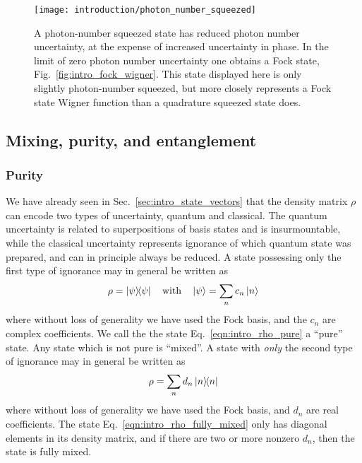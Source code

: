 \begin{figure}[htp]
\centering
\captionsetup{width=0.8\linewidth}
\texttt{[image: introduction/photon\_number\_squeezed]}
\caption{\label{fig:intro_photon_number_squeezed_wigner} A photon-number squeezed state has reduced photon number uncertainty, at the expense of increased uncertainty in phase. In the limit of zero photon number uncertainty one obtains a Fock state, Fig.~\ref{fig:intro_fock_wigner}. This state displayed here is only slightly photon-number squeezed, but more closely represents a Fock state Wigner function than a quadrature squeezed state does. }
\end{figure}



\FloatBarrier
\subsection{Mixing, purity, and entanglement}

\subsubsection{Purity}
We have already seen in Sec.~\ref{sec:intro_state_vectors} that the density matrix $\rho$ can encode two types of uncertainty, quantum and classical. The quantum uncertainty is related to superpositions of basis states and is insurmountable, while the classical uncertainty represents ignorance of which quantum state was prepared, and can in principle always be reduced. A state possessing only the first type of ignorance may in general be written as
\begin{equation}\label{eqn:intro_rho_pure}
\rho = \dyad{\psi} \qq{with} \ket{\psi} = \sum_n c_n \ket{n}
\end{equation}
where without loss of generality we have used the Fock basis, and the $c_n$ are complex coefficients. We call the the state Eq.~\ref{eqn:intro_rho_pure} a ``pure'' state. Any state which is not pure is ``mixed''. A state with \emph{only} the second type of ignorance may in general be written as
\begin{equation}\label{eqn:intro_rho_fully_mixed}
\rho = \sum_n d_n \dyad{n}
\end{equation}
where without loss of generality we have used the Fock basis, and $d_n$ are real coefficients. The state Eq.~\ref{eqn:intro_rho_fully_mixed} only has diagonal elements in its density matrix, and if there are two or more nonzero $d_n$, then the state is fully mixed.

